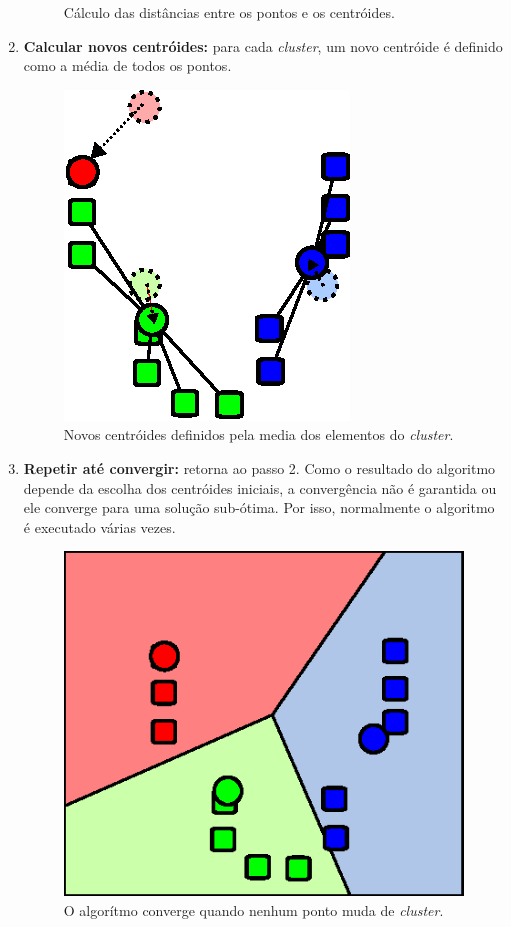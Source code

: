 \begin{enumerate}
\begin{figure}[h]
    \caption{Cálculo das distâncias entre os pontos e os centróides.}
  \end{figure}
  \item \textbf{Calcular novos centróides:} para cada \textit{cluster}, um novo centróide é definido como a média de todos os pontos.
  \begin{figure}[h]
    \centering
    \includegraphics[scale=0.6]{figuras/kmeans-3.eps}
    \caption{Novos centróides definidos pela media dos elementos do \textit{cluster}.}
  \end{figure}
  \item \textbf{Repetir até convergir:} retorna ao passo 2. Como o resultado do algoritmo depende da escolha dos centróides iniciais, a convergência não é garantida ou ele converge para uma solução sub-ótima. Por isso, normalmente o algoritmo é executado várias vezes.
  \begin{figure}[h]
    \centering
    \includegraphics[scale=0.6]{figuras/kmeans-4.eps}
    \caption{O algorítmo converge quando nenhum ponto muda de \textit{cluster}.}
  \end{figure}
\end{enumerate}

